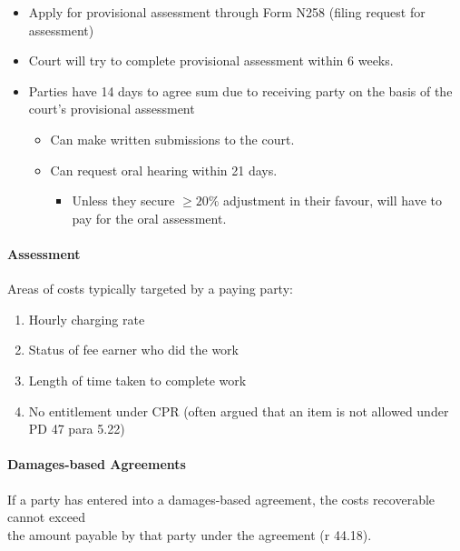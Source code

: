 \documentclass[
]{article}
\providecommand{\tightlist}{%
  \setlength{\itemsep}{0pt}\setlength{\parskip}{0pt}}
\begin{document}
\begin{itemize}
\tightlist
\item
  Apply for provisional assessment through Form N258 (filing request for
  assessment)
\item
  Court will try to complete provisional assessment within 6 weeks.
\item
  Parties have 14 days to agree sum due to receiving party on the basis
  of the court's provisional assessment

  \begin{itemize}
  \tightlist
  \item
    Can make written submissions to the court.
  \item
    Can request oral hearing within 21 days.

    \begin{itemize}
    \tightlist
    \item
      Unless they secure \(\geq 20\%\) adjustment in their favour, will
      have to pay for the oral assessment.
    \end{itemize}
  \end{itemize}
\end{itemize}

\hypertarget{assessment}{%
\paragraph{Assessment}\label{assessment}}

Areas of costs typically targeted by a paying party:

\begin{enumerate}
\def\labelenumi{\arabic{enumi}.}
\tightlist
\item
  Hourly charging rate
\item
  Status of fee earner who did the work
\item
  Length of time taken to complete work
\item
  No entitlement under CPR (often argued that an item is not allowed
  under PD 47 para 5.22)
\end{enumerate}

\hypertarget{damages-based-agreements}{%
\paragraph{Damages-based Agreements}\label{damages-based-agreements}}

If a party has entered into a damages-based agreement, the costs
recoverable cannot exceed\\
the amount payable by that party under the agreement (r 44.18).
\end{document}

